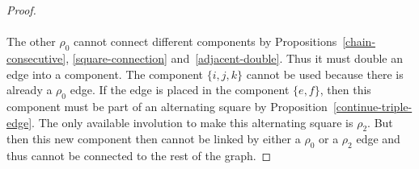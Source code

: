 \begin{proof}
  \begin{figure}[H]
    \begin{center}
      \caption{}
    \end{center}
  \end{figure}

  \paragraph{}The other $\rho_0$ cannot connect different components by Propositions~\ref{chain-consecutive}, \ref{square-connection} and~\ref{adjacent-double}. Thus it must double an edge into a component. The component $\{i,j,k\}$ cannot be used because there is already a $\rho_0$ edge. If the edge is placed in the component $\{e,f\}$, then this component must be part of an alternating square by Proposition~\ref{continue-triple-edge}. The only available involution to make this alternating square is $\rho_2$. But then this new component then cannot be linked by either a $\rho_0$ or a $\rho_2$ edge and thus cannot be connected to the rest of the graph.


\end{proof}
